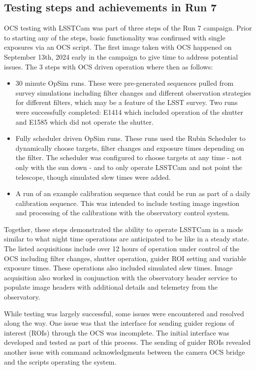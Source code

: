 \subsection{Testing steps and achievements in Run 7}
OCS testing with LSSTCam was part of three steps of the Run 7 campaign. Prior to starting any of the steps, basic functionality was confirmed with single exposures via an OCS script. The first image taken with OCS happened on September 13th, 2024 early in the campaign to give time to address potential issues. The 3 steps with OCS driven operation where then as follows:
\begin{itemize}
    \item 30 minute OpSim runs. These were pre-generated sequences pulled from survey simulations including filter changes and different observation strategies for different filters, which may be a feature of the LSST survey. Two runs were successfully completed: E1414 which included operation of the shutter and E1585 which did not operate the shutter.
    \item Fully scheduler driven OpSim runs. These runs used the Rubin Scheduler to dynamically choose targets, filter changes and exposure times depending on the filter. The scheduler was configured to choose targets at any time - not only with the sun down - and to only operate LSSTCam and not point the telescope, though simulated slew times were added. 
    \item A run of an example calibration sequence that could be run as part of a daily calibration sequence. This was intended to include testing image ingestion and processing of the calibrations with the observatory control system.
\end{itemize}

Together, these steps demonstrated the ability to operate LSSTCam in a mode similar to what night time operations are anticipated to be like in a steady state. The listed acquisitions include over 12 hours of operation under control of the OCS including filter changes, shutter operation, guider ROI setting and variable exposure times. These operations also included simulated slew times. Image acquisition also worked in conjunction with the observatory header service to populate image headers with additional details and telemetry from the observatory.

While testing was largely successful, some issues were encountered and resolved along the way. One issue was that the interface for sending guider regions of interest (ROIs) through the OCS was incomplete. The initial interface was developed and tested as part of this process. The sending of guider ROIs revealed another issue with command acknowledgments between the camera OCS bridge and the scripts operating the system.  


